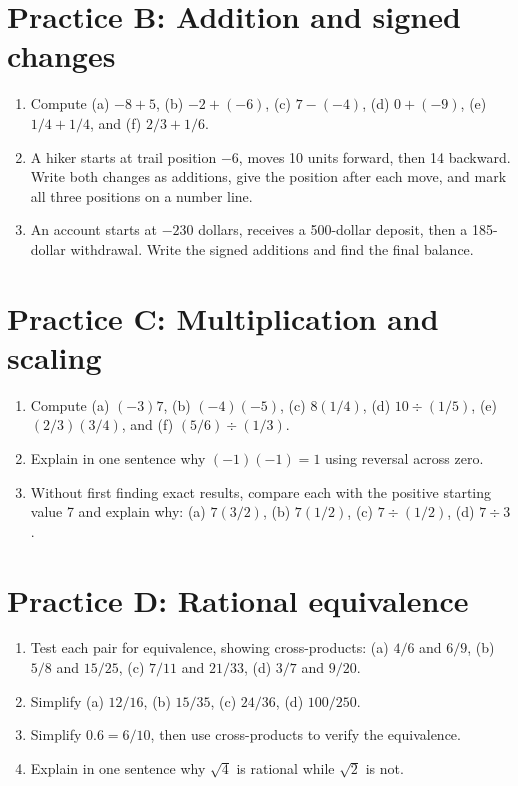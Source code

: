 \documentclass[12pt,letterpaper]{article}
\begin{document}
\section*{Practice B: Addition and signed changes}
\begin{enumerate}[label=B\arabic*.,leftmargin=2.5em,itemsep=10pt]
\item Compute (a) $-8+5$, (b) $-2+(-6)$, (c) $7-(-4)$, (d) $0+(-9)$, (e) $1/4+1/4$, and (f) $2/3+1/6$.
\item A hiker starts at trail position $-6$, moves 10 units forward, then 14 backward. Write both changes as additions, give the position after each move, and mark all three positions on a number line.
\item An account starts at $-230$ dollars, receives a 500-dollar deposit, then a 185-dollar withdrawal. Write the signed additions and find the final balance.
\end{enumerate}
\section*{Practice C: Multiplication and scaling}
\begin{enumerate}[label=C\arabic*.,leftmargin=2.5em,itemsep=10pt]
\item Compute (a) $(-3)7$, (b) $(-4)(-5)$, (c) $8(1/4)$, (d) $10\div(1/5)$, (e) $(2/3)(3/4)$, and (f) $(5/6)\div(1/3)$.
\item Explain in one sentence why $(-1)(-1)=1$ using reversal across zero.
\item Without first finding exact results, compare each with the positive starting value 7 and explain why: (a) $7(3/2)$, (b) $7(1/2)$, (c) $7\div(1/2)$, (d) $7\div3$.
\end{enumerate}
\section*{Practice D: Rational equivalence}
\begin{enumerate}[label=D\arabic*.,leftmargin=2.5em,itemsep=10pt]
\item Test each pair for equivalence, showing cross-products: (a) $4/6$ and $6/9$, (b) $5/8$ and $15/25$, (c) $7/11$ and $21/33$, (d) $3/7$ and $9/20$.
\item Simplify (a) $12/16$, (b) $15/35$, (c) $24/36$, (d) $100/250$.
\item Simplify $0.6=6/10$, then use cross-products to verify the equivalence.
\item Explain in one sentence why $\sqrt4$ is rational while $\sqrt2$ is not.
\end{enumerate}
\end{document}

